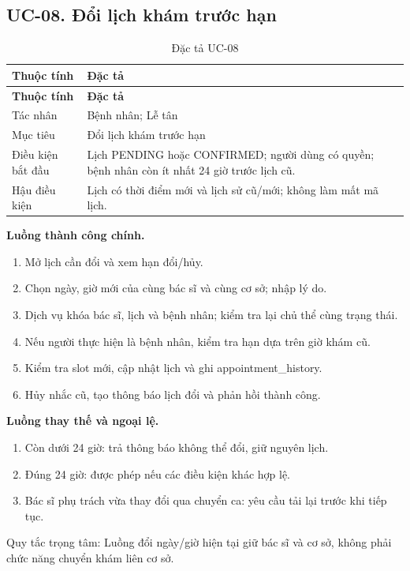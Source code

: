 \clearpage

\subsection{UC-08.\allowbreak{} Đổi lịch khám trước hạn}
\label{uc:8}

{\small\setlength{\tabcolsep}{3pt}\renewcommand{\arraystretch}{1.12}
\begin{longtable}{@{}L{\textwidth-1.32pt\relax} L{\textwidth-4.68pt\relax}@{}}
\caption{Đặc tả UC-08}\\
\toprule
\textbf{Thuộc tính} & \textbf{Đặc tả}\\\midrule
\endfirsthead
\toprule
\textbf{Thuộc tính} & \textbf{Đặc tả}\\\midrule
\endhead
\bottomrule\endlastfoot
Tác nhân & Bệnh nhân; Lễ tân\\[3pt]
Mục tiêu & Đổi lịch khám trước hạn\\[3pt]
Điều kiện bắt đầu & Lịch PENDING hoặc CONFIRMED; người dùng có quyền; bệnh nhân còn ít nhất 24 giờ trước lịch cũ.\allowbreak{}\\[3pt]
Hậu điều kiện & Lịch có thời điểm mới và lịch sử cũ/\allowbreak{}mới; không làm mất mã lịch.\allowbreak{}\\[3pt]
\end{longtable}}
\noindent\textbf{Luồng thành công chính.}
\begin{enumerate}
\item Mở lịch cần đổi và xem hạn đổi/\allowbreak{}hủy.\allowbreak{}
\item Chọn ngày, giờ mới của cùng bác sĩ và cùng cơ sở; nhập lý do.\allowbreak{}
\item Dịch vụ khóa bác sĩ, lịch và bệnh nhân; kiểm tra lại chủ thể cùng trạng thái.\allowbreak{}
\item Nếu người thực hiện là bệnh nhân, kiểm tra hạn dựa trên giờ khám cũ.\allowbreak{}
\item Kiểm tra slot mới, cập nhật lịch và ghi appointment\_\allowbreak{}history.\allowbreak{}
\item Hủy nhắc cũ, tạo thông báo lịch đổi và phản hồi thành công.\allowbreak{}
\end{enumerate}
\noindent\textbf{Luồng thay thế và ngoại lệ.}
\begin{enumerate}
\item Còn dưới 24 giờ:\allowbreak{} trả thông báo không thể đổi, giữ nguyên lịch.\allowbreak{}
\item Đúng 24 giờ:\allowbreak{} được phép nếu các điều kiện khác hợp lệ.\allowbreak{}
\item Bác sĩ phụ trách vừa thay đổi qua chuyển ca:\allowbreak{} yêu cầu tải lại trước khi tiếp tục.\allowbreak{}
\end{enumerate}
Quy tắc trọng tâm:\allowbreak{} Luồng đổi ngày/\allowbreak{}giờ hiện tại giữ bác sĩ và cơ sở, không phải chức năng chuyển khám liên cơ sở.\allowbreak{}

